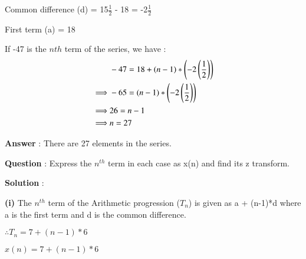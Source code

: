 \documentclass[journal,12pt,twocolumn]{IEEEtran}
\theoremstyle{remark}
\begin{document}
\vspace{4mm}

Common difference (d) = 15\(\frac{1}{2}\) - 18 = -2\(\frac{1}{2}\)

First term (a) = 18

\vspace{4mm}

If -47 is the \(n{th}\) term of the series, we have :
\begin{align}
&-47 = 18 + (n-1)*\left(-2\left(\frac{1}{2}\right)\right) \notag\\ 
\implies& -65 = (n-1)*\left(-2\left(\frac{1}{2}\right)\right) \notag\\
\implies& 26 = n-1\notag\\
\implies& n = 27\notag
\end{align} 

\large\textbf{Answer} : \normalsize There are 27 elements in the series.

\vspace{10mm}

\large\textbf{Question} : \normalsize Express the $n^{th}$ term in each case as x(n) and find its z transform.

\vspace{4mm}

\large\textbf{Solution} : \normalsize

\vspace{4mm}

\textbf{(i)} The \(n^{th}\) term of the Arithmetic progression ($T_{n}$) is given as a + (n-1)*d where a is the first term and d is the common difference.

$\therefore T_{n} = 7 + (n-1)*6 $

$x(n) = 7 + (n-1)*6$
\end{document}
